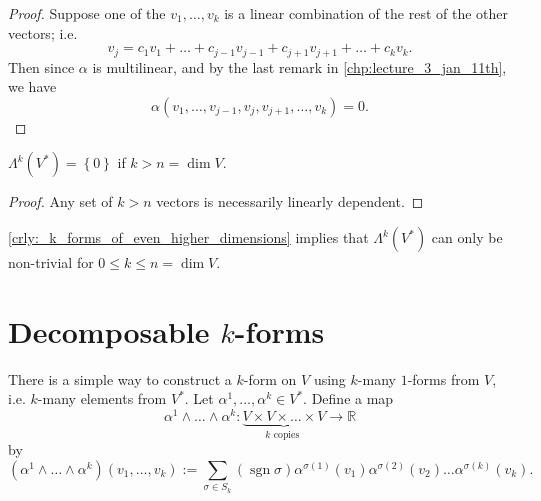 \documentclass[notoc,notitlepage]{tufte-book}
\DeclareMathOperator{\sgn}{sgn}
\begin{document}
\begin{proof}
  Suppose one of the $v_1, \ldots, v_k$ is a linear combination of the rest of the
  other vectors; i.e.
  \begin{equation*}
    v_j = c_1 v_1 + \hdots + c_{j - 1} v_{j - 1} + c_{j + 1} v_{j + 1} + \hdots + c_k v_k.
  \end{equation*}
  Then since $\alpha$ is multilinear, and by the last remark in \cref{chp:lecture_3_jan_11th},
  we have
  \begin{equation*}
    \alpha (v_1, \ldots, v_{j - 1}, v_j , v_{j + 1}, \ldots, v_k) = 0.
  \end{equation*}
\end{proof}

\begin{crly}\label{crly:_k_forms_of_even_higher_dimensions}
  $\Lambda^k \left( V^* \right) = \left\{ 0 \right\}$ if $k > n = \dim V$.
\end{crly}

\begin{proof}
  Any set of $k > n$ vectors is necessarily linearly dependent.
\end{proof}

\begin{note}
  \cref{crly:_k_forms_of_even_higher_dimensions} implies that $\Lambda^k \left( V^* \right)$
  can only be non-trivial for $0 \leq k \leq n = \dim V$.
\end{note}


\section{Decomposable \texorpdfstring{$k$}{k}-forms}%
\label{sec:decomposable_k_forms}

There is a simple way to construct a $k$-form on $V$ using $k$-many $1$-forms from $V$, i.e.
$k$-many elements from $V^*$. Let $\alpha^1, \ldots, \alpha^k \in V^*$. Define a map
\begin{equation*}
  \alpha^1 \land \hdots \land \alpha^k : \underbrace{V \times V \times \hdots
  \times V}_{k \text{ copies }} \to \mathbb{R}
\end{equation*}
by
\begin{equation}\label{eq:defining_a_k_form}
  \left( \alpha^1 \land \hdots \land \alpha^k \right) ( v_1, \ldots, v_k )
  := \sum_{\sigma \in S_k} \left( \sgn \sigma \right) \alpha^{\sigma(1)}(v_1)
  \alpha^{\sigma(2)}(v_2) \hdots \alpha^{\sigma(k)}(v_k).
\end{equation}
\end{document}
